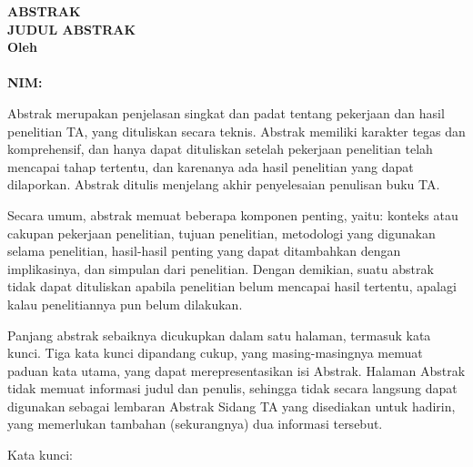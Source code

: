 \clearpage
{}
{}
\begin{center}
\textbf{\large  ABSTRAK}\\[0.5cm]
\textbf{\large JUDUL ABSTRAK}\\[0.5cm]
\textbf{Oleh}\\
\textbf{\penulis}\\
\textbf{NIM: \nim}\\[2em]
\end{center}

\noindent Abstrak merupakan penjelasan singkat dan padat tentang pekerjaan dan hasil penelitian TA, yang dituliskan secara teknis. Abstrak memiliki karakter tegas dan komprehensif, dan hanya dapat dituliskan setelah pekerjaan penelitian telah mencapai tahap tertentu, dan karenanya ada hasil penelitian yang dapat dilaporkan. Abstrak ditulis menjelang akhir penyelesaian penulisan buku TA.

Secara umum, abstrak memuat beberapa komponen penting, yaitu: konteks atau cakupan pekerjaan penelitian, tujuan penelitian, metodologi yang digunakan selama penelitian, hasil-hasil penting yang dapat ditambahkan dengan implikasinya, dan simpulan dari penelitian. Dengan demikian, suatu abstrak tidak dapat dituliskan apabila penelitian belum mencapai hasil tertentu, apalagi kalau penelitiannya pun belum dilakukan.

Panjang abstrak sebaiknya dicukupkan dalam satu halaman, termasuk kata kunci. Tiga kata kunci dipandang cukup, yang masing-masingnya memuat paduan kata utama, yang dapat merepresentasikan isi Abstrak. Halaman Abstrak tidak memuat informasi judul dan penulis, sehingga tidak secara langsung dapat digunakan sebagai lembaran Abstrak Sidang TA yang disediakan untuk hadirin, yang memerlukan tambahan (sekurangnya) dua informasi tersebut.


\noindent Kata kunci: \katakunci
